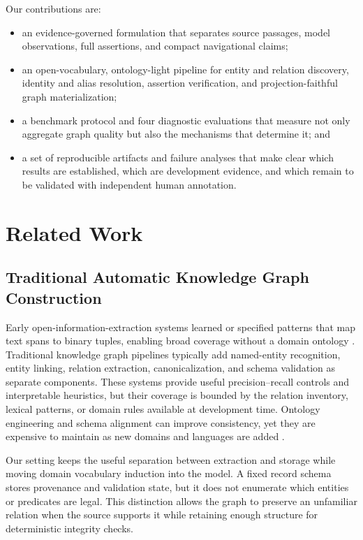 \documentclass[11pt]{article}
\begin{document}
Our contributions are:
\begin{itemize}
  \item an evidence-governed formulation that separates source passages, model observations, full assertions, and compact navigational claims;
  \item an open-vocabulary, ontology-light pipeline for entity and relation discovery, identity and alias resolution, assertion verification, and projection-faithful graph materialization;
  \item a benchmark protocol and four diagnostic evaluations that measure not only aggregate graph quality but also the mechanisms that determine it; and
  \item a set of reproducible artifacts and failure analyses that make clear which results are established, which are development evidence, and which remain to be validated with independent human annotation.
\end{itemize}

\section{Related Work}
\label{sec:related}

\subsection{Traditional Automatic Knowledge Graph Construction}
\label{sec:traditional}

Early open-information-extraction systems learned or specified patterns that map text spans to binary tuples, enabling broad coverage without a domain ontology \citep{banko2007,angeli2015}. Traditional knowledge graph pipelines typically add named-entity recognition, entity linking, relation extraction, canonicalization, and schema validation as separate components. These systems provide useful precision--recall controls and interpretable heuristics, but their coverage is bounded by the relation inventory, lexical patterns, or domain rules available at development time. Ontology engineering and schema alignment can improve consistency, yet they are expensive to maintain as new domains and languages are added \citep{hogan2021,noy2001}.

Our setting keeps the useful separation between extraction and storage while moving domain vocabulary induction into the model. A fixed record schema stores provenance and validation state, but it does not enumerate which entities or predicates are legal. This distinction allows the graph to preserve an unfamiliar relation when the source supports it while retaining enough structure for deterministic integrity checks.
\end{document}
